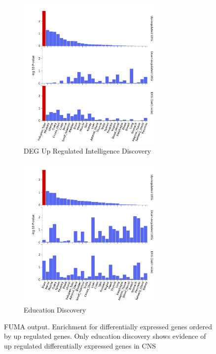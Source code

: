 \begin{figure}
  \begin{subfigure}{8cm}
    \centering\includegraphics[width=7cm]{images/FUMA_plots/deg_general_up/ukbb_int_upreg_general_gtex_v8_ts_general_FUMA_gene2func44709.png}
    \caption{DEG Up Regulated Intelligence Discovery}
  \end{subfigure}
  \begin{subfigure}{8cm}
    \centering\includegraphics[width=7cm]{images/FUMA_plots/deg_general_up/ukbbed_upreg_general_gtex_v8_ts_general_FUMA_gene2func44709.png}
    \caption{Education Discovery}
  \end{subfigure}
  \caption{FUMA output. Enrichment for differentially expressed genes ordered by up regulated genes. Only education discovery shows evidence of up regulated differentially expressed genes in CNS}
  \label{fig:FUMA gtex deg samples multiple}
\end{figure}

